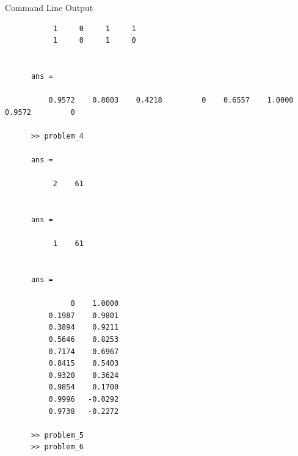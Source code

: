 \documentclass[10pt]{extarticle}
\begin{document}
\begin{problem}{Command Line Output}
\begin{lstlisting}
           1     0     1     1
           1     0     1     0


      ans =

          0.9572    0.8003    0.4218         0    0.6557    1.0000    0.9572         0

      >> problem_4

      ans =

           2    61


      ans =

           1    61


      ans =

               0    1.0000
          0.1987    0.9801
          0.3894    0.9211
          0.5646    0.8253
          0.7174    0.6967
          0.8415    0.5403
          0.9320    0.3624
          0.9854    0.1700
          0.9996   -0.0292
          0.9738   -0.2272

      >> problem_5
      >> problem_6
    \end{lstlisting}
  \end{problem}
\end{document}
